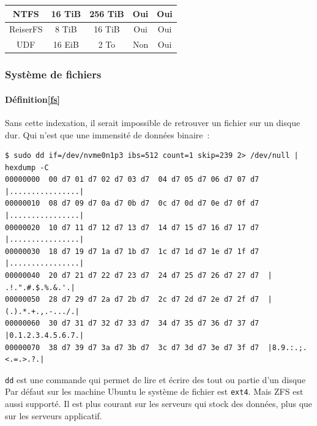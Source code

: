 \documentclass{beamer}
\begin{document}
\begin{frame}
\begin{footnotesize}
\begin{table}[h!]
\begin{tabular}{|c|c|c|c|c|}
                    NTFS         & 16 TiB               & 256 TiB                & Oui                 & Oui                         \\ \hline
                    ReiserFS     & 8 TiB                & 16 TiB                 & Oui                 & Oui                         \\ \hline
                    UDF          & 16 EiB               & 2 To                   & Non                 & Oui                         \\ \hline
                \end{tabular}
            \end{table}
        \end{footnotesize}
    \end{frame}

    \begin{frame}[fragile]
        \transdissolve
        \frametitle{Système de fichiers}
        \framesubtitle{Définition\cref{fs}}
        Sans cette indexation, il serait impossible de retrouver un fichier sur un disque dur.
        Qui n'est que une immensité de données binaire~:
        \begin{lstlisting}
$ sudo dd if=/dev/nvme0n1p3 ibs=512 count=1 skip=239 2> /dev/null | hexdump -C
00000000  00 d7 01 d7 02 d7 03 d7  04 d7 05 d7 06 d7 07 d7  |................|
00000010  08 d7 09 d7 0a d7 0b d7  0c d7 0d d7 0e d7 0f d7  |................|
00000020  10 d7 11 d7 12 d7 13 d7  14 d7 15 d7 16 d7 17 d7  |................|
00000030  18 d7 19 d7 1a d7 1b d7  1c d7 1d d7 1e d7 1f d7  |................|
00000040  20 d7 21 d7 22 d7 23 d7  24 d7 25 d7 26 d7 27 d7  | .!.".#.$.%.&.'.|
00000050  28 d7 29 d7 2a d7 2b d7  2c d7 2d d7 2e d7 2f d7  |(.).*.+.,.-.../.|
00000060  30 d7 31 d7 32 d7 33 d7  34 d7 35 d7 36 d7 37 d7  |0.1.2.3.4.5.6.7.|
00000070  38 d7 39 d7 3a d7 3b d7  3c d7 3d d7 3e d7 3f d7  |8.9.:.;.<.=.>.?.|
        \end{lstlisting}
        \lstinline{dd} est une commande qui permet de lire et écrire des tout ou partie d'un disque
        \bigbreak
        Par défaut sur les machine Ubuntu le système de fichier est \lstinline{ext4}.
        \bigbreak
        Mais ZFS est aussi supporté.
        Il est plus courant sur les serveurs qui stock des données, plus que sur les serveurs applicatif.
    \end{frame}
\end{document}
